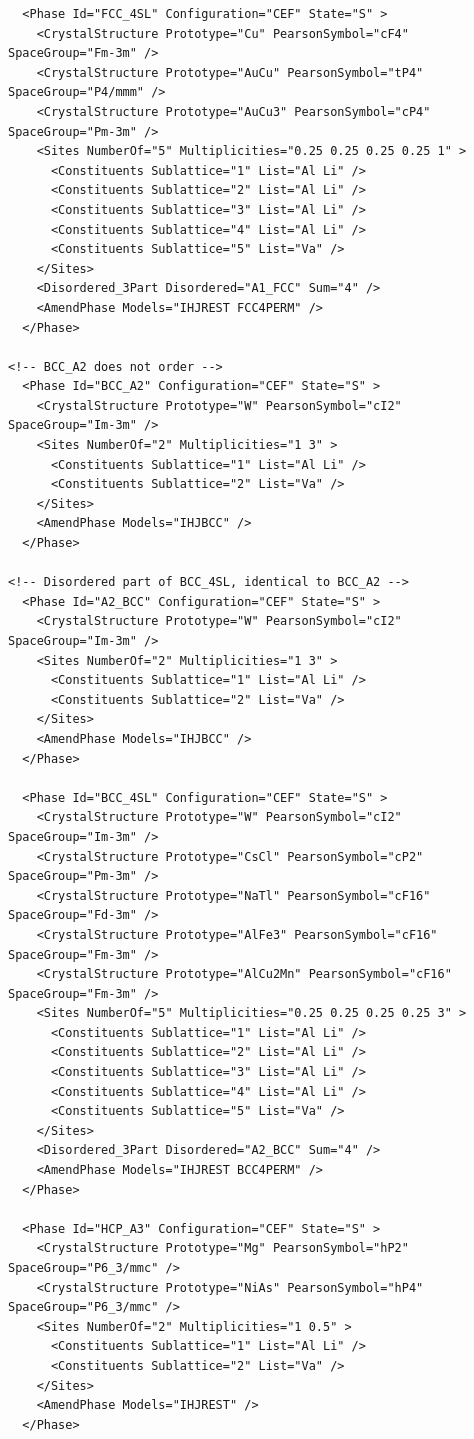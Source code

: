 \documentclass{article}
\begin{document}
\begin{appendices}
\begin{verbatim}
  <Phase Id="FCC_4SL" Configuration="CEF" State="S" >
	<CrystalStructure Prototype="Cu" PearsonSymbol="cF4" SpaceGroup="Fm-3m" />
	<CrystalStructure Prototype="AuCu" PearsonSymbol="tP4" SpaceGroup="P4/mmm" />
	<CrystalStructure Prototype="AuCu3" PearsonSymbol="cP4" SpaceGroup="Pm-3m" />
    <Sites NumberOf="5" Multiplicities="0.25 0.25 0.25 0.25 1" >
      <Constituents Sublattice="1" List="Al Li" />
      <Constituents Sublattice="2" List="Al Li" />
      <Constituents Sublattice="3" List="Al Li" />
      <Constituents Sublattice="4" List="Al Li" />
      <Constituents Sublattice="5" List="Va" />
    </Sites>
    <Disordered_3Part Disordered="A1_FCC" Sum="4" />
    <AmendPhase Models="IHJREST FCC4PERM" />
  </Phase>

<!-- BCC_A2 does not order -->
  <Phase Id="BCC_A2" Configuration="CEF" State="S" >
	<CrystalStructure Prototype="W" PearsonSymbol="cI2" SpaceGroup="Im-3m" />
    <Sites NumberOf="2" Multiplicities="1 3" >
      <Constituents Sublattice="1" List="Al Li" />
      <Constituents Sublattice="2" List="Va" />
    </Sites>
    <AmendPhase Models="IHJBCC" />
  </Phase>

<!-- Disordered part of BCC_4SL, identical to BCC_A2 -->
  <Phase Id="A2_BCC" Configuration="CEF" State="S" >
	<CrystalStructure Prototype="W" PearsonSymbol="cI2" SpaceGroup="Im-3m" />
    <Sites NumberOf="2" Multiplicities="1 3" >
      <Constituents Sublattice="1" List="Al Li" />
      <Constituents Sublattice="2" List="Va" />
    </Sites>
    <AmendPhase Models="IHJBCC" />
  </Phase>

  <Phase Id="BCC_4SL" Configuration="CEF" State="S" >
	<CrystalStructure Prototype="W" PearsonSymbol="cI2" SpaceGroup="Im-3m" />
	<CrystalStructure Prototype="CsCl" PearsonSymbol="cP2" SpaceGroup="Pm-3m" />
	<CrystalStructure Prototype="NaTl" PearsonSymbol="cF16" SpaceGroup="Fd-3m" />
	<CrystalStructure Prototype="AlFe3" PearsonSymbol="cF16" SpaceGroup="Fm-3m" />
	<CrystalStructure Prototype="AlCu2Mn" PearsonSymbol="cF16" SpaceGroup="Fm-3m" />
    <Sites NumberOf="5" Multiplicities="0.25 0.25 0.25 0.25 3" >
      <Constituents Sublattice="1" List="Al Li" />
      <Constituents Sublattice="2" List="Al Li" />
      <Constituents Sublattice="3" List="Al Li" />
      <Constituents Sublattice="4" List="Al Li" />
      <Constituents Sublattice="5" List="Va" />
    </Sites>
    <Disordered_3Part Disordered="A2_BCC" Sum="4" />
    <AmendPhase Models="IHJREST BCC4PERM" />
  </Phase>

  <Phase Id="HCP_A3" Configuration="CEF" State="S" >
	<CrystalStructure Prototype="Mg" PearsonSymbol="hP2" SpaceGroup="P6_3/mmc" />
	<CrystalStructure Prototype="NiAs" PearsonSymbol="hP4" SpaceGroup="P6_3/mmc" />
    <Sites NumberOf="2" Multiplicities="1 0.5" >
      <Constituents Sublattice="1" List="Al Li" />
      <Constituents Sublattice="2" List="Va" />
    </Sites>
    <AmendPhase Models="IHJREST" />
  </Phase>


\end{verbatim}
\end{appendices}
\end{document}
